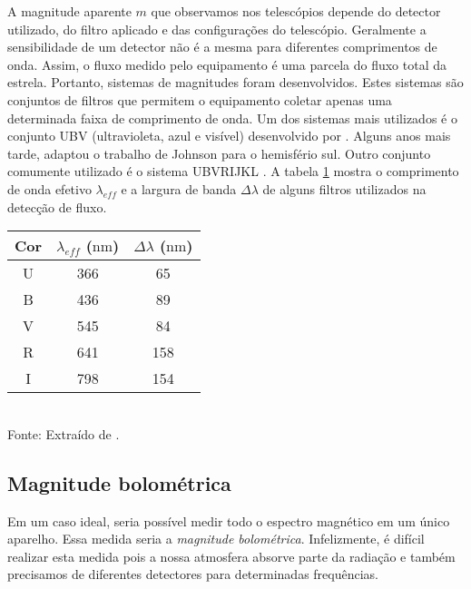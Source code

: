 A magnitude aparente $m$ que observamos nos telescópios depende do detector utilizado, do filtro aplicado e das configurações do telescópio. Geralmente a sensibilidade de um detector não é a mesma para diferentes comprimentos de onda. Assim, o fluxo medido pelo equipamento é uma parcela do fluxo total da estrela. Portanto, sistemas de magnitudes foram desenvolvidos. Estes sistemas são conjuntos de filtros que permitem o equipamento coletar apenas uma determinada faixa de comprimento de onda. Um dos sistemas mais utilizados é o conjunto UBV (ultravioleta, azul e visível) desenvolvido por \citet{Johnson1953}. Alguns anos mais tarde, \citet{Cousins1973} adaptou o trabalho de Johnson para o hemisfério sul. Outro conjunto comumente utilizado é o sistema UBVRIJKL \citep{Johnson1966}. A tabela \ref{tab:filtros} mostra o comprimento de onda efetivo $\lambda_{eff}$ e a largura de banda $\Delta \lambda$ de alguns filtros utilizados na detecção de fluxo.

\begin{table}[h!]
\begin{center}
\begin{tabular}{c|c|c} 
\hline 
Cor & $\lambda_{eff}$ ($\si{\nano\metre}$) & $\Delta \lambda$ ($\si{\nano\metre}$) \\ 
\hline 
U & 366 & 65 \\ 
B & 436 & 89\\
V & 545 & 84 \\
R & 641 & 158\\ 
I & 798 & 154 \\
\hline 
\end{tabular} \\
\small
\vspace{2mm}Fonte: Extraído de \cite{Catelan_book}.
\label{tab:filtros}
\end{center}
\end{table}


\subsection{Magnitude bolométrica}

Em um caso ideal, seria possível medir todo o espectro magnético em um único aparelho. Essa medida seria a \textit{magnitude bolométrica}. Infelizmente, é difícil realizar esta medida pois a nossa atmosfera absorve parte da radiação e também precisamos de diferentes detectores para determinadas frequências.


